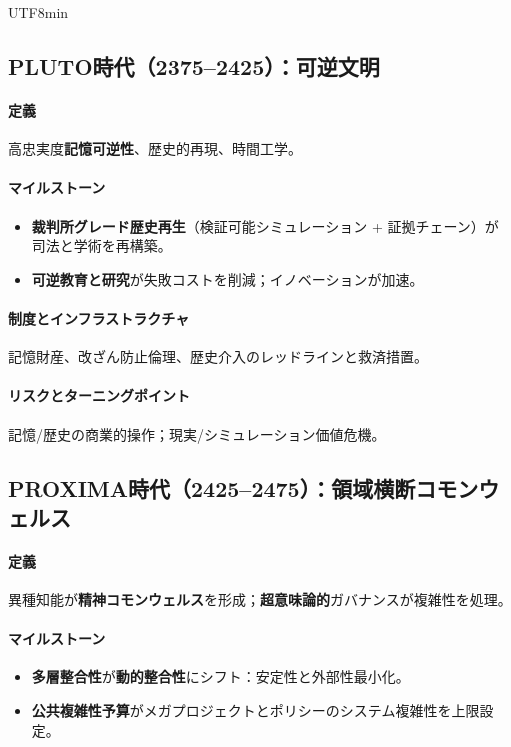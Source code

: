 \documentclass[11pt]{article}
\begin{document}
\begin{CJK}{UTF8}{min}
\begin{itemize}[noitemsep]
\subsection{PLUTO時代（2375–2425）：可逆文明}
\paragraph{定義} 高忠実度\textbf{記憶可逆性}、歴史的再現、時間工学。

\paragraph{マイルストーン}
\begin{itemize}[noitemsep]
  \item \textbf{裁判所グレード歴史再生}（検証可能シミュレーション + 証拠チェーン）が司法と学術を再構築。
  \item \textbf{可逆教育と研究}が失敗コストを削減；イノベーションが加速。
\end{itemize}

\paragraph{制度とインフラストラクチャ} 記憶財産、改ざん防止倫理、歴史介入のレッドラインと救済措置。

\paragraph{リスクとターニングポイント} 記憶/歴史の商業的操作；現実/シミュレーション価値危機。

\subsection{PROXIMA時代（2425–2475）：領域横断コモンウェルス}
\paragraph{定義} 異種知能が\textbf{精神コモンウェルス}を形成；\textbf{超意味論的}ガバナンスが複雑性を処理。

\paragraph{マイルストーン}
\begin{itemize}[noitemsep]
  \item \textbf{多層整合性}が\textbf{動的整合性}にシフト：安定性と外部性最小化。
  \item \textbf{公共複雑性予算}がメガプロジェクトとポリシーのシステム複雑性を上限設定。
\end{itemize}


\end{itemize}
\end{CJK}
\end{document}

